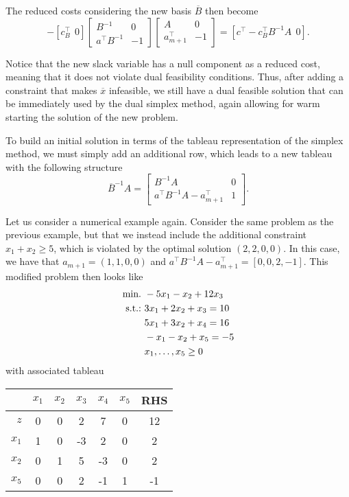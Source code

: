 The reduced costs considering the new basis $\overline{B}$ then become
%
\begin{equation*}
	[c^\top ~~ 0] - [c_B^\top ~~ 0]\begin{bmatrix} B^{-1} & 0 \\ a^\top B^{-1} & -1 \end{bmatrix}\begin{bmatrix} A & 0 \\ a_{m+1}^\top & -1 \end{bmatrix} = [c^\top - c^\top_B B^{-1}A ~~ 0].
\end{equation*}
  	
Notice that the new slack variable has a null component as a reduced cost, meaning that it does not violate dual feasibility conditions. Thus, after adding a constraint that makes $\overline{x}$ infeasible, we still have a dual feasible solution that can be immediately used by the dual simplex method, again allowing for warm starting the solution of the new problem.

To build an initial solution in terms of the tableau representation of the simplex method, we must simply add an additional row, which leads to a new tableau with the following structure
%
\begin{equation*}
	\overline{B}^{-1}A = \begin{bmatrix} B^{-1}A & 0 \\ a^\top B^{-1}A - a_{m+1}^\top & 1 \end{bmatrix}.
\end{equation*}
%		

Let us consider a numerical example again. Consider the same problem as the previous example, but that we instead include the additional constraint $x_1 + x_2 \geq 5$, which is violated by the optimal solution $(2,2,0,0)$. In this case, we have that $a_{m+1} = (1,1,0,0)$ and $a^\top B^{-1} A - a^\top_{m+1} = [0, 0, 2, -1]$. This modified problem then looks like
%
\begin{align*}
	\mathop{\text{min.~}} & -5x_1 -x_2 + 12 x_3 \\
	\mathop{\text{s.t.:~}}   & 3x_1 + 2x_2 + x_3  = 10 \\
	& 5x_1 + 3x_2 + x_4 = 16 \\
	& -x_1 - x_2 + x_5 = -5  \\
	& x_1, \dots, x_5 \geq 0
\end{align*}
%
with associated tableau

\begin{center}
	\begin{tabular}{r|ccccc|c} 
	   &$x_1$ & $x_2$ & $x_3$ & $x_4$ & $x_5$ & RHS \\ \hline	
	   $z$ & 0 & 0 & 2 & 7 & 0 & 12                 \\ \hline
	   $x_1$ & 1 & 0 & -3 & 2 & 0 & 2 				\\
	   $x_2$ & 0 & 1 & 5 & -3 & 0 & 2 				\\
	   $x_5$ &  0 &  0 &  2 & -1 & 1 & -1           
	\end{tabular}
\end{center}

